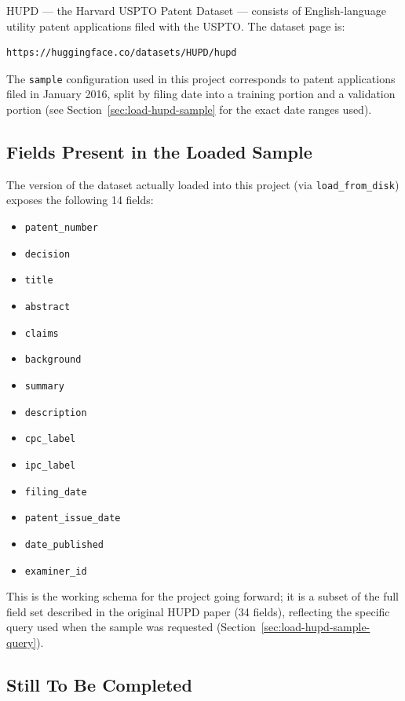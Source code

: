 \documentclass[11pt]{article}
\begin{document}
HUPD --- the Harvard USPTO Patent Dataset --- consists of English-language utility patent applications filed with the USPTO. The dataset page is:

\begin{lstlisting}
https://huggingface.co/datasets/HUPD/hupd
\end{lstlisting}

\noindent The \texttt{sample} configuration used in this project corresponds to patent applications filed in January 2016, split by filing date into a training portion and a validation portion (see Section~\ref{sec:load-hupd-sample} for the exact date ranges used).

\subsection{Fields Present in the Loaded Sample}

The version of the dataset actually loaded into this project (via \texttt{load\_from\_disk}) exposes the following 14 fields:

\begin{itemize}
    \item \texttt{patent\_number}
    \item \texttt{decision}
    \item \texttt{title}
    \item \texttt{abstract}
    \item \texttt{claims}
    \item \texttt{background}
    \item \texttt{summary}
    \item \texttt{description}
    \item \texttt{cpc\_label}
    \item \texttt{ipc\_label}
    \item \texttt{filing\_date}
    \item \texttt{patent\_issue\_date}
    \item \texttt{date\_published}
    \item \texttt{examiner\_id}
\end{itemize}

\noindent This is the working schema for the project going forward; it is a subset of the full field set described in the original HUPD paper (34 fields), reflecting the specific query used when the sample was requested (Section~\ref{sec:load-hupd-sample-query}).

\subsection{Still To Be Completed}
\end{document}
